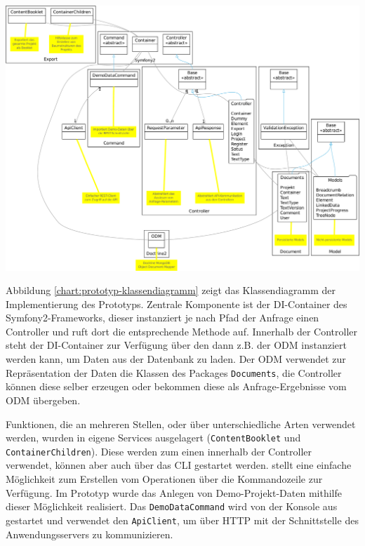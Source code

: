 \begin{center}
\includegraphics[width=\textwidth]{media/prototyp-klassendiagramm.pdf}
\label{chart:prototyp-klassendiagramm}
\end{center}

Abbildung \ref{chart:prototyp-klassendiagramm} zeigt das Klassendiagramm der Implementierung des Prototyps. Zentrale Komponente ist der DI-Container des Symfony2-Frameworks, dieser instanziert je nach Pfad der Anfrage einen Controller und ruft dort die entsprechende Methode auf. Innerhalb der Controller steht der DI-Container zur Verfügung über den dann z.B. der ODM instanziert werden kann, um Daten aus der Datenbank zu laden. Der ODM verwendet zur Repräsentation der Daten die Klassen des Packages \texttt{Documents}, die Controller können diese selber erzeugen oder bekommen diese als Anfrage-Ergebnisse vom ODM übergeben.

Funktionen, die an mehreren Stellen, oder über unterschiedliche Arten verwendet werden, wurden in eigene Services ausgelagert (\texttt{ContentBooklet} und \texttt{ContainerChildren}). Diese werden zum einen innerhalb der Controller verwendet, können aber auch über das CLI gestartet werden.  stellt eine einfache Möglichkeit zum Erstellen vom Operationen über die Kommandozeile zur Verfügung. Im Prototyp wurde das Anlegen von Demo-Projekt-Daten mithilfe dieser Möglichkeit realisiert. Das \texttt{DemoDataCommand} wird von der Konsole aus gestartet und verwendet den \texttt{ApiClient}, um über HTTP mit der Schnittstelle des Anwendungsservers zu kommunizieren.

